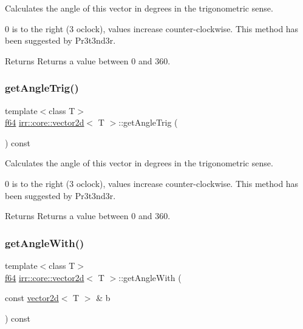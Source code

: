 Calculates the angle of this vector in degrees in the trigonometric sense. 

0 is to the right (3 o\textquotesingle{}clock), values increase counter-\/clockwise. This method has been suggested by Pr3t3nd3r. \begin{DoxyReturn}{Returns}
Returns a value between 0 and 360. 
\end{DoxyReturn}
\mbox{\label{classirr_1_1core_1_1vector2d_a5aa73f5d0487d651af7dd3ea4a51ea67}} 
\subsubsection{\texorpdfstring{get\+Angle\+Trig()}{getAngleTrig()}\hspace{0.1cm}{\footnotesize\ttfamily [2/2]}}
{\footnotesize\ttfamily template$<$class T$>$ \\
\hyperlink{namespaceirr_a1325b02603ad449f92c68fc640af9b28}{f64} \hyperlink{classirr_1_1core_1_1vector2d}{irr\+::core\+::vector2d}$<$ T $>$\+::get\+Angle\+Trig (\begin{DoxyParamCaption}{ }\end{DoxyParamCaption}) const\hspace{0.3cm}{\ttfamily [inline]}}



Calculates the angle of this vector in degrees in the trigonometric sense. 

0 is to the right (3 o\textquotesingle{}clock), values increase counter-\/clockwise. This method has been suggested by Pr3t3nd3r. \begin{DoxyReturn}{Returns}
Returns a value between 0 and 360. 
\end{DoxyReturn}
\mbox{\label{classirr_1_1core_1_1vector2d_a82714b4037cc4985992647ea69974a60}} 
\subsubsection{\texorpdfstring{get\+Angle\+With()}{getAngleWith()}\hspace{0.1cm}{\footnotesize\ttfamily [1/2]}}
{\footnotesize\ttfamily template$<$class T$>$ \\
\hyperlink{namespaceirr_a1325b02603ad449f92c68fc640af9b28}{f64} \hyperlink{classirr_1_1core_1_1vector2d}{irr\+::core\+::vector2d}$<$ T $>$\+::get\+Angle\+With (\begin{DoxyParamCaption}\item[{const \hyperlink{classirr_1_1core_1_1vector2d}{vector2d}$<$ T $>$ \&}]{b }\end{DoxyParamCaption}) const\hspace{0.3cm}{\ttfamily [inline]}}



